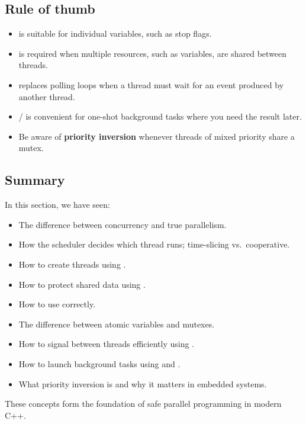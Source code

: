 \subsection{Rule of thumb}
\label{c6:sec:rules}
\begin{itemize}
  \item {} is suitable for individual variables, such as stop flags.
  \item {} is required when multiple resources, such as variables, are shared
    between threads.
  \item {} replaces polling loops when a thread must wait for an event
    produced by another thread.
  \item {} /  is convenient for one-shot background tasks where
    you need the result later.
  \item Be aware of \textbf{priority inversion} whenever threads of mixed priority share a mutex.
\end{itemize}

\subsection{Summary}
\label{c6:sec:threadsummary}
In this section, we have seen:
\begin{itemize}
  \item The difference between concurrency and true parallelism.
  \item How the scheduler decides which thread runs; time-slicing vs.\ cooperative.
  \item How to create threads using .
  \item How to protect shared data using .
  \item How to use  correctly.
  \item The difference between atomic variables and mutexes.
  \item How to signal between threads efficiently using .
  \item How to launch background tasks using  and .
  \item What priority inversion is and why it matters in embedded systems.
\end{itemize}
These concepts form the foundation of safe parallel programming in modern C++.
